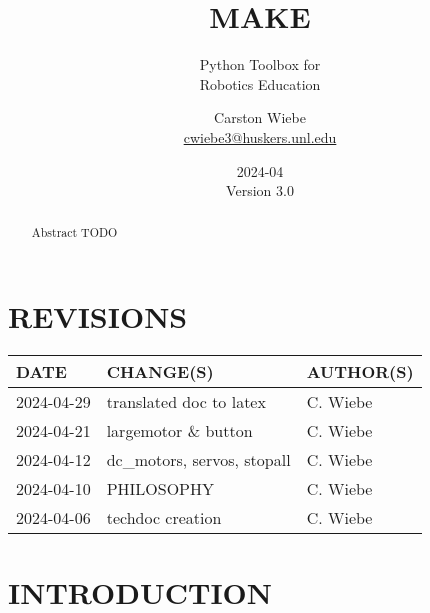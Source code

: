 \documentclass[12pt]{scrartcl} %
\title{MAKE}
\subtitle{
  Python Toolbox for \\
  Robotics Education
}
\author{
  Carston Wiebe \\
  \href{mailto:cwiebe3@huskers.unl.edu}{cwiebe3@huskers.unl.edu} \\
}
\date{
  2024-04 \\
  Version 3.0
}
\begin{document}

\maketitle
\thispagestyle{empty}

\vfill

\begin{abstract}
  Abstract TODO
\end{abstract}

\newpage
\clearpage

\section*{REVISIONS}

\begin{table}[htp]
  \centering
  \def\arraystretch{1.5}
  \begin{tabular}{|l|l|l|}
    \hline
    DATE       & CHANGE(S)                   & AUTHOR(S) \\
    \hline
    2024-04-29 & translated doc to latex     & C. Wiebe  \\
    \hline
    2024-04-21 & largemotor \& button        & C. Wiebe  \\
    \hline
    2024-04-12 & dc\_motors, servos, stopall & C. Wiebe  \\
    \hline
    2024-04-10 & PHILOSOPHY                  & C. Wiebe  \\
    \hline
    2024-04-06 & techdoc creation            & C. Wiebe  \\
    \hline
  \end{tabular}
\end{table}

\newpage

\tableofcontents

\newpage

\section{INTRODUCTION}
\end{document}
